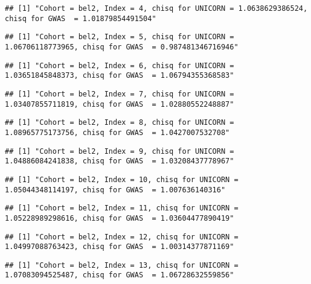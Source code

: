 \documentclass[]{article}
\begin{document}
\begin{verbatim}
## [1] "Cohort = bel2, Index = 4, chisq for UNICORN = 1.0638629386524, chisq for GWAS  = 1.01879854491504"
\end{verbatim}

\begin{verbatim}
## [1] "Cohort = bel2, Index = 5, chisq for UNICORN = 1.06706118773965, chisq for GWAS  = 0.987481346716946"
\end{verbatim}

\begin{verbatim}
## [1] "Cohort = bel2, Index = 6, chisq for UNICORN = 1.03651845848373, chisq for GWAS  = 1.06794355368583"
\end{verbatim}

\begin{verbatim}
## [1] "Cohort = bel2, Index = 7, chisq for UNICORN = 1.03407855711819, chisq for GWAS  = 1.02880552248887"
\end{verbatim}

\begin{verbatim}
## [1] "Cohort = bel2, Index = 8, chisq for UNICORN = 1.08965775173756, chisq for GWAS  = 1.0427007532708"
\end{verbatim}

\begin{verbatim}
## [1] "Cohort = bel2, Index = 9, chisq for UNICORN = 1.04886084241838, chisq for GWAS  = 1.03208437778967"
\end{verbatim}

\begin{verbatim}
## [1] "Cohort = bel2, Index = 10, chisq for UNICORN = 1.05044348114197, chisq for GWAS  = 1.007636140316"
\end{verbatim}

\begin{verbatim}
## [1] "Cohort = bel2, Index = 11, chisq for UNICORN = 1.05228989298616, chisq for GWAS  = 1.03604477890419"
\end{verbatim}

\begin{verbatim}
## [1] "Cohort = bel2, Index = 12, chisq for UNICORN = 1.04997088763423, chisq for GWAS  = 1.00314377871169"
\end{verbatim}

\begin{verbatim}
## [1] "Cohort = bel2, Index = 13, chisq for UNICORN = 1.07083094525487, chisq for GWAS  = 1.06728632559856"
\end{verbatim}
\end{document}
